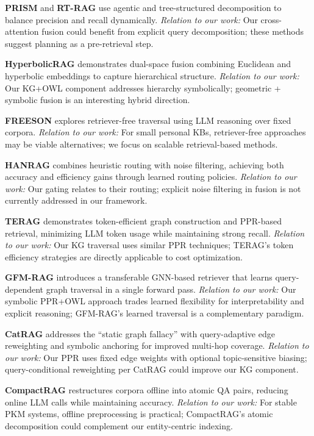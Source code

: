 \documentclass[11pt,a4paper]{article}
\begin{document}
\textbf{PRISM} \citep{prism2025} and \textbf{RT-RAG} \citep{rtrag2026} use agentic and tree-structured decomposition to balance precision and recall dynamically. \textit{Relation to our work:} Our cross-attention fusion could benefit from explicit query decomposition; these methods suggest planning as a pre-retrieval step.

\textbf{HyperbolicRAG} \citep{hyprag2025} demonstrates dual-space fusion combining Euclidean and hyperbolic embeddings to capture hierarchical structure. \textit{Relation to our work:} Our KG+OWL component addresses hierarchy symbolically; geometric + symbolic fusion is an interesting hybrid direction.

\textbf{FREESON} \citep{freeson2025} explores retriever-free traversal using LLM reasoning over fixed corpora. \textit{Relation to our work:} For small personal KBs, retriever-free approaches may be viable alternatives; we focus on scalable retrieval-based methods.

\textbf{HANRAG} \citep{hanrag2025} combines heuristic routing with noise filtering, achieving both accuracy and efficiency gains through learned routing policies. \textit{Relation to our work:} Our gating relates to their routing; explicit noise filtering in fusion is not currently addressed in our framework.

\textbf{TERAG} \citep{terag2025} demonstrates token-efficient graph construction and PPR-based retrieval, minimizing LLM token usage while maintaining strong recall. \textit{Relation to our work:} Our KG traversal uses similar PPR techniques; TERAG's token efficiency strategies are directly applicable to cost optimization.

\textbf{GFM-RAG} \citep{gfmrag2025} introduces a transferable GNN-based retriever that learns query-dependent graph traversal in a single forward pass. \textit{Relation to our work:} Our symbolic PPR+OWL approach trades learned flexibility for interpretability and explicit reasoning; GFM-RAG's learned traversal is a complementary paradigm.

\textbf{CatRAG} \citep{catrag2025} addresses the ``static graph fallacy'' with query-adaptive edge reweighting and symbolic anchoring for improved multi-hop coverage. \textit{Relation to our work:} Our PPR uses fixed edge weights with optional topic-sensitive biasing; query-conditional reweighting per CatRAG could improve our KG component.

\textbf{CompactRAG} \citep{compactrag2025} restructures corpora offline into atomic QA pairs, reducing online LLM calls while maintaining accuracy. \textit{Relation to our work:} For stable PKM systems, offline preprocessing is practical; CompactRAG's atomic decomposition could complement our entity-centric indexing.
\end{document}
